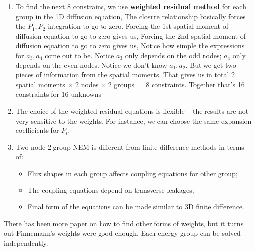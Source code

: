 \documentclass{school-22.211-notes}
\begin{document}
\begin{enumerate}
  \item To find the next 8 constrains, we use \textbf{weighted residual method} for each group in the 1D diffusion equation, 
    The closure relationship basically forces the $P_1, P_2$ integration to go to zero. Forcing the 1st spatial moment of diffusion equation to go to zero gives us, 
    Forcing the 2nd spatial moment of diffusion equation to go to zero gives us, 
    Notice how simple the expressions for $a_3, a_4$ come out to be. Notice $a_3$ only depends on the odd nodes; $a_4$ only depends on the even nodes. Notice we don't know $a_1, a_2$. But we get two pieces of information from the spatial moments. That gives us in total 2 spatial moments $\times$ 2 nodes $\times$ 2 groups $= 8$ constraints. Together that's 16 constraints for 16 unknowns. 

  \item The choice of the weighted residual equations is flexible -- the results are not very sensitive to the weights. For instance, we can choose the same expansion coefficients for $P_i$. 

  \item Two-node 2-group NEM is different from finite-difference methods in terms of: 
    \begin{itemize}
      \item Flux shapes in each group affects coupling equations for other group;
      \item The coupling equations depend on transverse leakages;
      \item Final form of the equations can be made similar to 3D finite difference. 
    \end{itemize}
  \end{enumerate}
There has been more paper on how to find other forms of weights, but it turns out Finnemann's weights were good enough. Each energy group can be solved independently. 
\end{document}

